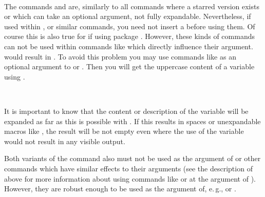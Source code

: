 
\begin{Declaration}
  \\
\end{Declaration}
%
\begin{Explain}
  The commands  and  are,
  similarly to all commands where a starred version exists or which
  can take an optional argument, not fully expandable. Nevertheless,
  if used within ,
   or similar commands, you need
  not insert a  before using them.
  Of course this is also true for 
  if using package . However, these kinds of
  commands can not be used within commands like
   which directly
  influence their argument.
  would result in . To avoid this
  problem you may use commands like  as an
  optional argument to  or . Then
  you will get the uppercase content of a variable using
  .
\end{Explain}
%
%


\begin{Declaration}
  \\
\end{Declaration}
%
%
\begin{Explain}
  It is important to know that the content or description of the
  variable will be expanded as far as this is possible with
  . If this results in spaces or unexpandable macros like
  , the result will be not empty even where the use of
  the variable would not result in any visible output.
  
  Both variants of the command also must not be used as the argument
  of  or other commands
  which have similar effects to their arguments (see the description
  of  above for more information about using
  commands like  or  at the
  argument of ). However, they are robust enough
  to be used as the argument of, e.\,g.,  or
  .
\end{Explain}
%
%

